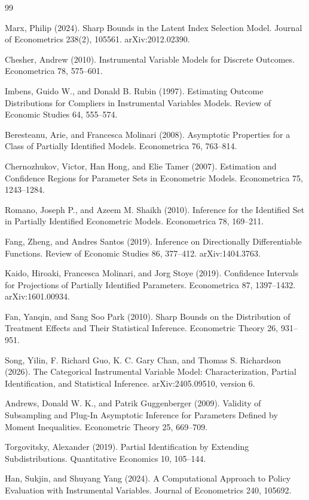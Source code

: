 \documentclass{article}
\begin{document}
\begin{thebibliography}{99}

   Marx, Philip (2024). Sharp Bounds in the Latent Index Selection Model. Journal of Econometrics 238(2), 105561. arXiv:2012.02390.

   Chesher, Andrew (2010). Instrumental Variable Models for Discrete Outcomes. Econometrica 78, 575--601.

   Imbens, Guido W., and Donald B. Rubin (1997). Estimating Outcome Distributions for Compliers in Instrumental Variables Models. Review of Economic Studies 64, 555--574.

   Beresteanu, Arie, and Francesca Molinari (2008). Asymptotic Properties for a Class of Partially Identified Models. Econometrica 76, 763--814.

   Chernozhukov, Victor, Han Hong, and Elie Tamer (2007). Estimation and Confidence Regions for Parameter Sets in Econometric Models. Econometrica 75, 1243--1284.

   Romano, Joseph P., and Azeem M. Shaikh (2010). Inference for the Identified Set in Partially Identified Econometric Models. Econometrica 78, 169--211.

   Fang, Zheng, and Andres Santos (2019). Inference on Directionally Differentiable Functions. Review of Economic Studies 86, 377--412. arXiv:1404.3763.

   Kaido, Hiroaki, Francesca Molinari, and Jorg Stoye (2019). Confidence Intervals for Projections of Partially Identified Parameters. Econometrica 87, 1397--1432. arXiv:1601.00934.

   Fan, Yanqin, and Sang Soo Park (2010). Sharp Bounds on the Distribution of Treatment Effects and Their Statistical Inference. Econometric Theory 26, 931--951.

   Song, Yilin, F. Richard Guo, K. C. Gary Chan, and Thomas S. Richardson (2026). The Categorical Instrumental Variable Model: Characterization, Partial Identification, and Statistical Inference. arXiv:2405.09510, version 6.

   Andrews, Donald W. K., and Patrik Guggenberger (2009). Validity of Subsampling and Plug-In Asymptotic Inference for Parameters Defined by Moment Inequalities. Econometric Theory 25, 669--709.

   Torgovitsky, Alexander (2019). Partial Identification by Extending Subdistributions. Quantitative Economics 10, 105--144.

   Han, Sukjin, and Shuyang Yang (2024). A Computational Approach to Policy Evaluation with Instrumental Variables. Journal of Econometrics 240, 105692.

\end{thebibliography}
\end{document}
